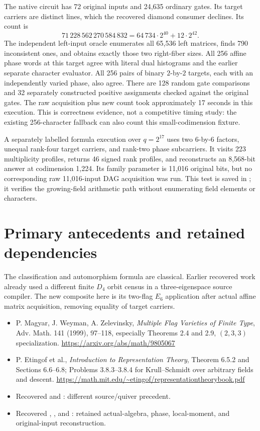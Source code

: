 \documentclass[11pt]{article}
\begin{document}
The native circuit has 72 original inputs and 24,635 ordinary gates. Its
target carriers are distinct lines, which the recovered diamond consumer
declines. Its count is
\[
 71\,228\,562\,270\,584\,832
 =64\,734\cdot2^{40}+12\cdot2^{42}.
\]
The independent left-input oracle enumerates all 65,536 left matrices,
finds 790 inconsistent ones, and obtains exactly those two right-fiber
sizes. All 256 affine phase words at this target agree with literal dual
histograms and the earlier separate character evaluator. All 256 pairs
of binary $2$-by-$2$ targets, each with an independently varied phase,
also agree. There are 128 random gate comparisons and 32 separately
constructed positive assignments checked against the original gates.
The raw acquisition plus new count took approximately 17 seconds in this
execution. This is correctness evidence, not a competitive timing study:
the existing 256-character fallback can also count this small-codimension
fixture.

A separately labelled formula execution over $q=2^{17}$ uses two
$6$-by-$6$ factors, unequal rank-four target carriers, and rank-two phase
subcarriers. It visits 223 multiplicity profiles, returns 46 signed rank
profiles, and reconstructs an 8,568-bit answer at codimension 1,224.
Its family parameter is 11,016 original bits, but no corresponding raw
11,016-input DAG acquisition was run. This test is saved in
; it verifies the growing-field arithmetic
path without enumerating field elements or characters.

\section*{Primary antecedents and retained dependencies}
The classification and automorphism formula are classical. Earlier
recovered work already used a different finite $D_4$ orbit census in a
three-eigenspace source compiler. The new composite here is its
two-flag $E_6$ application after actual affine matrix acquisition,
removing equality of target carriers.
\begin{itemize}
\item P. Magyar, J. Weyman, A. Zelevinsky, \emph{Multiple Flag Varieties
of Finite Type}, Adv. Math. 141 (1999), 97--118, especially Theorems
2.4 and 2.9, $(2,3,3)$ specialization.
\url{https://arxiv.org/abs/math/9805067}
\item P. Etingof et al., \emph{Introduction to Representation Theory},
Theorem 6.5.2 and Sections 6.6--6.8; Problems 3.8.3--3.8.4 for
Krull--Schmidt over arbitrary fields and descent.
\url{https://math.mit.edu/~etingof/representationtheorybook.pdf}
\item Recovered 
and : different source/quiver precedent.
\item Recovered ,
, and
: retained
actual-algebra, phase, local-moment, and original-input reconstruction.
\end{itemize}
\end{document}
